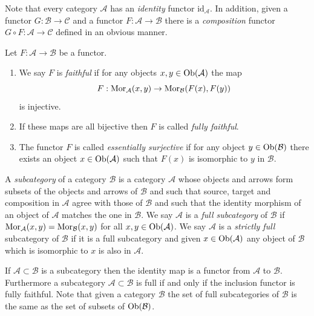 \noindent
Note that every category $\mathcal{A}$ has an
{\it identity} functor
$\text{id}_\mathcal{A}$.
In addition, given a functor $G : \mathcal{B}
\to \mathcal{C}$
and a functor $F : \mathcal{A} \to
\mathcal{B}$ there is
a {\it composition} functor $G \circ F :
\mathcal{A} \to \mathcal{C}$
defined in an obvious manner.

\begin{definition}
\label{definition-faithful}
Let $F : \mathcal{A} \to \mathcal{B}$ be a
functor.
\begin{enumerate}
\item We say $F$ is {\it faithful} if
for any objects $x, y \in \mathop{\mathrm{Ob}}\nolimits(\mathcal{A})$
the map
$$
F : \mathop{\mathrm{Mor}}\nolimits_\mathcal{A}(x, y) \to
\mathop{\mathrm{Mor}}\nolimits_\mathcal{B}(F(x), F(y))
$$
is injective.
\item If these maps are all bijective then
$F$ is called
{\it fully faithful}.
\item
The functor $F$ is called {\it essentially
surjective} if for any
object $y \in \mathop{\mathrm{Ob}}\nolimits(\mathcal{B})$ there exists
an object
$x \in \mathop{\mathrm{Ob}}\nolimits(\mathcal{A})$ such that $F(x)$ is
isomorphic to $y$ in
$\mathcal{B}$.
\end{enumerate}
\end{definition}

\begin{definition}
\label{definition-subcategory}
A {\it subcategory} of a category
$\mathcal{B}$ is a category $\mathcal{A}$
whose objects and arrows form subsets of the
objects and arrows of $\mathcal{B}$
and such that source, target and composition
in $\mathcal{A}$ agree with those
of $\mathcal{B}$ and such that the identity
morphism of an object of
$\mathcal{A}$ matches the one in
$\mathcal{B}$. We say $\mathcal{A}$ is a
{\it full subcategory} of $\mathcal{B}$ if
$\mathop{\mathrm{Mor}}\nolimits_\mathcal{A}(x, y)
= \mathop{\mathrm{Mor}}\nolimits_\mathcal{B}(x, y)$ for all $x, y \in
\mathop{\mathrm{Ob}}\nolimits(\mathcal{A})$.
We say $\mathcal{A}$ is a {\it strictly full}
subcategory of $\mathcal{B}$
if it is a full subcategory and given $x \in
\mathop{\mathrm{Ob}}\nolimits(\mathcal{A})$ any
object of $\mathcal{B}$ which is isomorphic
to $x$ is also in $\mathcal{A}$.
\end{definition}

\noindent
If $\mathcal{A} \subset \mathcal{B}$ is a
subcategory then the
identity map is a functor from $\mathcal{A}$
to $\mathcal{B}$.
Furthermore a subcategory $\mathcal{A}
\subset \mathcal{B}$
is full if and only if the inclusion functor
is fully faithful.
Note that given a category $\mathcal{B}$ the
set of full subcategories
of $\mathcal{B}$ is the same as the set of
subsets of
$\mathop{\mathrm{Ob}}\nolimits(\mathcal{B})$.

